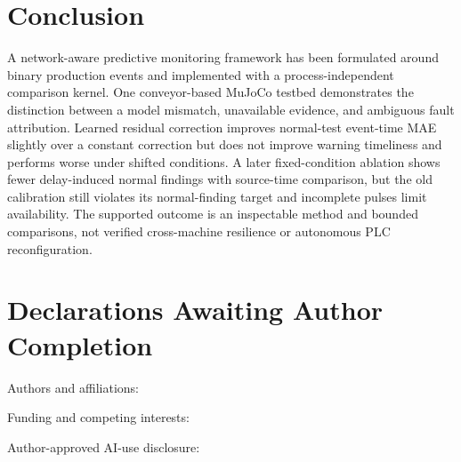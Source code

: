 \section{Conclusion}
A network-aware predictive monitoring framework has been formulated around binary production events and implemented with a process-independent comparison kernel. One conveyor-based MuJoCo testbed demonstrates the distinction between a model mismatch, unavailable evidence, and ambiguous fault attribution. Learned residual correction improves normal-test event-time MAE slightly over a constant correction but does not improve warning timeliness and performs worse under shifted conditions. A later fixed-condition ablation shows fewer delay-induced normal findings with source-time comparison, but the old calibration still violates its normal-finding target and incomplete pulses limit availability. The supported outcome is an inspectable method and bounded comparisons, not verified cross-machine resilience or autonomous PLC reconfiguration.

\section*{Declarations Awaiting Author Completion}
\noindent Authors and affiliations: \hrulefill\par\medskip
\noindent Funding and competing interests: \hrulefill\par\medskip
\noindent Author-approved AI-use disclosure: \hrulefill
